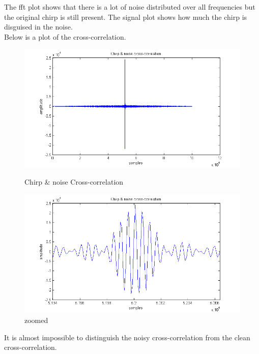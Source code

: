 The fft plot shows that there is a lot of noise distributed over all frequencies but the original chirp is still present. The signal plot shows how much the chirp is disguised in the noise.\\
Below is a plot of the cross-correlation.
\begin{figure}[H]
\begin{minipage}[b]{0.49\linewidth}
\centering
\includegraphics[width=1\textwidth]{billeder/chirp_noise_xcorr}
\caption{Chirp \& noise Cross-correlation}
\label{fig:figure1}
\end{minipage}
\hspace{0.5cm}
\begin{minipage}[b]{0.49\linewidth}
\centering
\includegraphics[width=1\textwidth]{billeder/chirp_noise_xcorr_zoom}
\caption{zoomed}
\label{fig:figure2}
\end{minipage}
\end{figure}
It is almost impossible to distinguish the noisy cross-correlation from the clean cross-correlation.\\